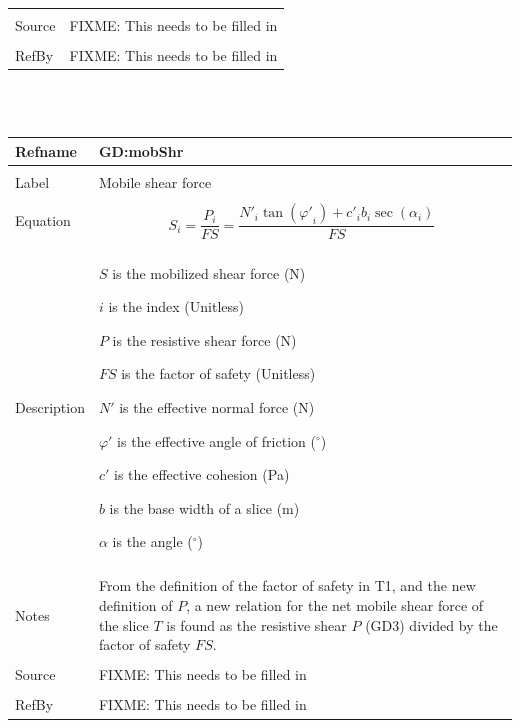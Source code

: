 \documentclass[12pt]{article}
\begin{document}
\begin{minipage}{\textwidth}
\begin{tabular}{p{} p{}}
\\ \midrule \\
Source & FIXME: This needs to be filled in
\\ \midrule \\
RefBy & FIXME: This needs to be filled in
\\ \bottomrule \end{tabular}
\end{minipage}\\
~\newline
\noindent \begin{minipage}{\textwidth}
\begin{tabular}{p{} p{}}
\toprule \textbf{Refname} & \textbf{GD:mobShr}
\label{GD:mobShr}
\\ \midrule \\
Label & Mobile shear force
\\ \midrule \\
Equation & \begin{dmath}
           S_{i}=\frac{P_{i}}{FS}=\frac{{N'}_{i} \tan\left({φ'}_{i}\right)+{c'}_{i} b_{i} \sec\left(α_{i}\right)}{FS}
           \end{dmath}
\\ \midrule \\
Description & \begin{symbDescription}
              \item{$S$ is the mobilized shear force (N)}
              \item{$i$ is the index (Unitless)}
              \item{$P$ is the resistive shear force (N)}
              \item{$FS$ is the factor of safety (Unitless)}
              \item{$N'$ is the effective normal force (N)}
              \item{$φ'$ is the effective angle of friction (${}^{\circ}$)}
              \item{$c'$ is the effective cohesion (Pa)}
              \item{$b$ is the base width of a slice (m)}
              \item{$α$ is the angle (${}^{\circ}$)}
              \end{symbDescription}
\\ \midrule \\
Notes & From the definition of the factor of safety in T1, and the new definition of $P$, a new relation for the net mobile shear force of the slice $T$ is found as the resistive shear $P$ (GD3) divided by the factor of safety $FS$.
\\ \midrule \\
Source & FIXME: This needs to be filled in
\\ \midrule \\
RefBy & FIXME: This needs to be filled in
\\ \bottomrule \end{tabular}
\end{minipage}\\
\end{document}
